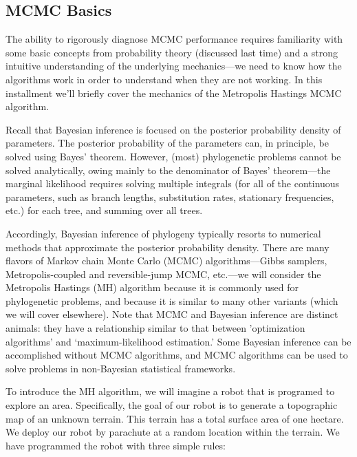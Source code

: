 \bigskip
\subsection{MCMC Basics}

The ability to rigorously diagnose MCMC performance requires familiarity with some basic concepts from probability theory (discussed last time) and a strong intuitive understanding of the underlying mechanics---we need to know how the algorithms work in order to understand when they are not working. 
In this installment we'll briefly cover the mechanics of the Metropolis Hastings MCMC algorithm.

Recall that Bayesian inference is focused on the posterior probability density of parameters.
The posterior probability of the parameters can, in principle, be solved using Bayes' theorem.
However, (most) phylogenetic problems cannot be solved analytically, owing mainly to the denominator of Bayes' theorem---the marginal likelihood requires solving multiple integrals (for all of the continuous parameters, such as branch lengths, substitution rates, stationary frequencies, etc.) for each tree, and summing over all trees.

Accordingly, Bayesian inference of phylogeny typically resorts to numerical methods that approximate the posterior probability density. 
There are many flavors of Markov chain Monte Carlo (MCMC) algorithms---Gibbs samplers, Metropolis-coupled and reversible-jump MCMC, etc.---we will consider the Metropolis Hastings (MH) algorithm because it is commonly used for phylogenetic problems, and because it is similar to many other variants (which we will cover elsewhere). 
Note that MCMC and Bayesian inference are distinct animals: they have a relationship similar to that between 'optimization algorithms' and ‘maximum-likelihood estimation.' 
Some Bayesian inference can be accomplished without MCMC algorithms, and MCMC algorithms can be used to solve problems in non-Bayesian statistical frameworks.

To introduce the MH algorithm, we will imagine a robot that is programed to explore an area. 
Specifically, the goal of our robot is to generate a topographic map of an unknown terrain. 
This terrain has a total surface area of one hectare. 
We deploy our robot by parachute at a random location within the terrain. 
We have programmed the robot with three simple rules:

